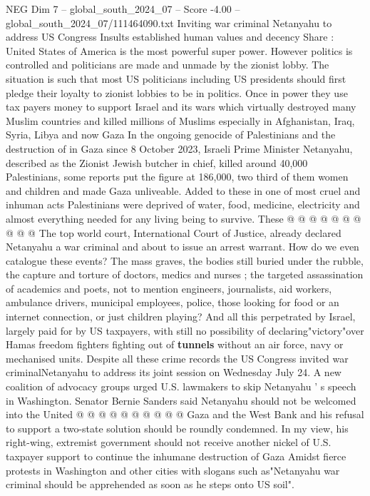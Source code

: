 \begin{textsample}{NEG Dim 7 – global\_south\_2024\_07 – Score -4.00 – global\_south\_2024\_07/111464090.txt}  \label{ex:f7_neg_337}
Inviting war criminal Netanyahu to address US Congress Insults established human values and decency Share : United States of America is the most powerful super power.
However politics is controlled and politicians are made and unmade by the zionist lobby.
The situation is such that most US politicians including US presidents should first pledge their loyalty to zionist lobbies to be in politics.
Once in power they use tax payers money to support Israel and its wars which virtually destroyed many Muslim countries and killed millions of Muslims especially in Afghanistan, Iraq, Syria, Libya and now Gaza In the ongoing genocide of Palestinians and the destruction of in Gaza since 8 October 2023, Israeli Prime Minister Netanyahu, described as the Zionist Jewish butcher in chief, killed around 40,000 Palestinians, some reports put the figure at 186,000, two third of them women and children and made Gaza unliveable.
Added to these in one of most cruel and inhuman acts Palestinians were deprived of water, food, medicine, electricity and almost everything needed for any living being to survive.
These @ @ @ @ @ @ @ @ @ @ The top world court, International Court of Justice, already declared Netanyahu a war criminal and about to issue an arrest warrant.
How do we even catalogue these events?
The mass graves, the bodies still buried under the rubble, the capture and torture of doctors, medics and nurses ; the targeted assassination of academics and poets, not to mention engineers, journalists, aid workers, ambulance drivers, municipal employees, police, those looking for food or an internet connection, or just children playing?
And all this perpetrated by Israel, largely paid for by US taxpayers, with still no possibility of declaring"victory"over Hamas freedom fighters fighting out of \textbf{tunnels} without an air force, navy or mechanised units.
Despite all these crime records the US Congress invited war criminalNetanyahu to address its joint session on Wednesday July 24.
A new coalition of advocacy groups urged U.S. lawmakers to skip Netanyahu ' s speech in Washington.
Senator Bernie Sanders said Netanyahu should not be welcomed into the United @ @ @ @ @ @ @ @ @ @ Gaza and the West Bank and his refusal to support a two-state solution should be roundly condemned.
In my view, his right-wing, extremist government should not receive another nickel of U.S. taxpayer support to continue the inhumane destruction of Gaza Amidst fierce protests in Washington and other cities with slogans such as"Netanyahu war criminal should be apprehended as soon as he steps onto US soil".

\end{textsample}

